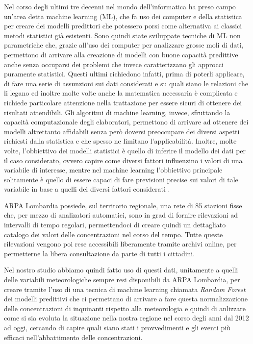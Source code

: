 \documentclass[a4paper,12pt]{report}
\begin{document}
Nel corso degli ultimi tre decenni nel mondo dell'informatica ha preso campo un'area detta machine learning (ML), che fa uso dei computer e della statistica per creare dei modelli predittori che potessero porsi come alternativa ai classici metodi statistici già esistenti. Sono quindi state sviluppate tecniche di ML non parametriche che, grazie all'uso dei computer per analizzare grosse moli di dati, permettono di arrivare alla creazione di modelli con buone capacità predittive anche senza occuparsi dei problemi che invece caratterizzano gli approcci puramente statistici. Questi ultimi richiedono infatti, prima di poterli applicare, di fare una serie di assunzioni sui dati considerati e su quali siano le relazioni che li legano ed inoltre molte volte anche la matematica necessaria è complicata e richiede particolare attenzione nella trattazione per essere sicuri di ottenere dei risultati attendibili. Gli algoritmi di machine learning, invece, sfruttando la capacità computazionale degli elaboratori, permettono di arrivare ad ottenere dei modelli altrettanto affidabili senza però doversi preoccupare dei diversi aspetti richiesti dalla statistica e che spesso ne limitano l'applicabilità. Inoltre, molte volte, l'obbiettivo dei modelli statistici è quello di inferire il modello dei dati per il caso considerato, ovvero capire come diversi fattori influenzino i valori di una variabile di interesse, mentre nel machine learning l'obbiettivo principale solitamente è quello di essere capaci di fare previsioni precise sui valori di tale variabile in base a quelli dei diversi fattori considerati \cite{breiman2003statistical}. 

ARPA Lombardia possiede, sul territorio regionale, una rete di 85 stazioni fisse che, per mezzo di analizatori automatici, sono in grad di fornire rilevazioni ad intervalli di tempo regolari, permettendoci di creare quindi un dettagliato catalogo dei valori delle concentrazioni nel corso del tempo. Tutte queste rilevazioni vengono poi rese accessibili liberamente tramite archivi online, per permetterne la libera consultazione da parte di tutti i cittadini.  

Nel nostro studio abbiamo quindi fatto uso di questi dati, unitamente a quelli delle variabili meteorologiche sempre resi disponibili da ARPA Lombardia, per creare tramite l'uso di una tecnica di machine learning chiamata \textit{Random Forest}
 dei modelli predittivi che ci permettano di arrivare a fare questa normalizzazione delle concentrazioni di inquinanti rispetto alla meteorologia e quindi di anlizzare come si sia evoluta la situazione nella nostra regione nel corso degli anni dal 2012 ad oggi, cercando di capire quali siano stati i provvedimenti e gli eventi più efficaci nell'abbattimento delle concentrazioni.  
\end{document}
